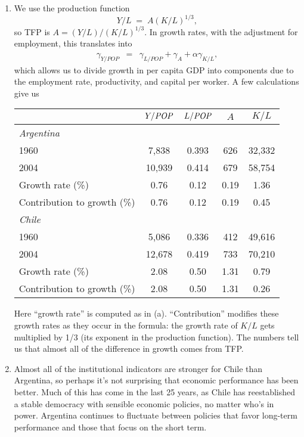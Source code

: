 \documentclass[letterpaper,12pt]{article}
\newcommand{\POP}{\mbox{\it POP\/}}
\begin{document}
\begin{enumerate}
\begin{enumerate}
\item We use the production function 
\[
    Y/L \;=\; A (K/L)^{1/3} ,
\]
so TFP is $ A = (Y/L) / (K/L)^{1/3}  $. 
In growth rates, with the adjustment for employment, 
this translates into 
\begin{eqnarray*}
    \gamma_{Y/POP} &=&  \gamma_{L/POP}  + \gamma_A 
                + \alpha \gamma_{K/L}  ,
\end{eqnarray*}
which allows us to divide growth in per capita GDP into 
components due to the employment rate, productivity, 
and capital per worker.  
A few calculations give us 
%
\begin{center}
\begin{tabular}{lcccc}
\hline\hline
            &  $Y/\POP$      &  $L/\POP$    &   $A$   &  $K/L$     \\
\hline\hline
\multicolumn{5}{l}{\it Argentina} \\
1960        &    7,838    &  0.393  &   626  &  32,332      \\
2004        &    10,939\phantom{1}   
                          &  0.414  &   679  &  58,754    \\
Growth rate (\%) &  0.76  &  0.12   &   0.19 &  1.36   \\
Contribution to growth (\%) 
                &   0.76  &  0.12   &   0.19 &  0.45  \\
\hline                 
\multicolumn{5}{l}{\it Chile} \\
1960        &    5,086    &  0.336   &  412  & 49,616      \\
2004        &    12,678\phantom{1}
                          &  0.419   &  733  & 70,210    \\
Growth rate (\%) &  2.08  &  0.50   &   1.31 &   0.79   \\
Contribution to growth (\%) 
                &   2.08  &  0.50   &  1.31  &   0.26  \\
\hline\hline
\end{tabular}
\end{center}
Here ``growth rate'' is computed as in (a).
``Contribution'' modifies these growth
rates as they occur in the formula:  the growth rate of $K/L$ gets
multiplied by 1/3 (its exponent in the production function).
The numbers tell us that almost all of the difference in growth 
comes from TFP.  

\item Almost all of the institutional indicators are stronger for Chile
than Argentina, so perhaps it's not surprising that economic performance
has been better.  
Much of this has come in the last 25 years, as Chile has reestablished a 
stable democracy with sensible economic policies, no matter who's in power.
Argentina continues to fluctuate between policies that favor long-term 
performance and those that focus on the short term.  


\end{enumerate}
\end{enumerate}
\end{document}
